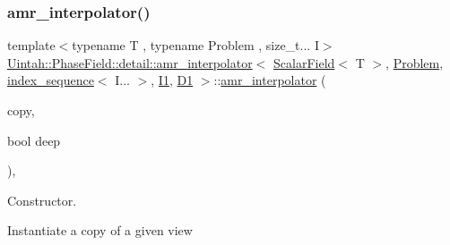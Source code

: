 \subsubsection{\texorpdfstring{amr\+\_\+interpolator()}{amr\_interpolator()}\hspace{0.1cm}{\footnotesize\ttfamily [1/4]}}
{\footnotesize\ttfamily template$<$typename T , typename Problem , size\+\_\+t... I$>$ \\
\hyperlink{classUintah_1_1PhaseField_1_1detail_1_1amr__interpolator}{Uintah\+::\+Phase\+Field\+::detail\+::amr\+\_\+interpolator}$<$ \hyperlink{structUintah_1_1PhaseField_1_1ScalarField}{Scalar\+Field}$<$ T $>$, \hyperlink{classUintah_1_1PhaseField_1_1Problem}{Problem}, \hyperlink{namespaceUintah_1_1PhaseField_a237de804d99512e50613aff7c94a9461}{index\+\_\+sequence}$<$ I... $>$, \hyperlink{namespaceUintah_1_1PhaseField_a547ce3002aa97fbd3ef3192a6eec8406a66f19efe774b0d2b6e5844eb2d83d305}{I1}, \hyperlink{namespaceUintah_1_1PhaseField_a12bfc68444894dffdf0cb8d9cf0cc76aa24dcc0ba6bcb45bc6f503b1b538c6809}{D1} $>$\+::\hyperlink{classUintah_1_1PhaseField_1_1detail_1_1amr__interpolator}{amr\+\_\+interpolator} (\begin{DoxyParamCaption}\item[{const \hyperlink{classUintah_1_1PhaseField_1_1detail_1_1amr__interpolator}{amr\+\_\+interpolator}$<$ \hyperlink{structUintah_1_1PhaseField_1_1ScalarField}{Scalar\+Field}$<$ T $>$, \hyperlink{classUintah_1_1PhaseField_1_1Problem}{Problem}, \hyperlink{namespaceUintah_1_1PhaseField_a237de804d99512e50613aff7c94a9461}{index\+\_\+sequence}$<$ I... $>$, \hyperlink{namespaceUintah_1_1PhaseField_a547ce3002aa97fbd3ef3192a6eec8406a66f19efe774b0d2b6e5844eb2d83d305}{I1}, \hyperlink{namespaceUintah_1_1PhaseField_a12bfc68444894dffdf0cb8d9cf0cc76aa24dcc0ba6bcb45bc6f503b1b538c6809}{D1} $>$ $\ast$}]{copy,  }\item[{bool}]{deep }\end{DoxyParamCaption})\hspace{0.3cm}{\ttfamily [inline]}, {\ttfamily [protected]}}



Constructor. 

Instantiate a copy of a given view


